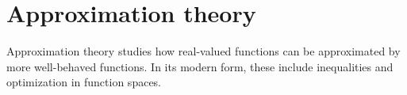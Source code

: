 \section{Approximation theory}\label{sec:approximation_theory}

Approximation theory studies how real-valued functions can be approximated by more well-behaved functions. In its modern form, these include inequalities and optimization in function spaces.
